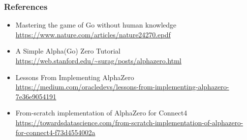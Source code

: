 \begin{frame}[fragile]
  \frametitle{References}

  \begin{itemize}
    \item Mastering the game of Go without human knowledge {\small\url{https://www.nature.com/articles/nature24270.epdf}}
    \item A Simple Alpha(Go) Zero Tutorial {\small\url{https://web.stanford.edu/~surag/posts/alphazero.html}}
    \item Lessons From Implementing AlphaZero {\small\url{https://medium.com/oracledevs/lessons-from-implementing-alphazero-7e36e9054191}}
    \item From-scratch implementation of AlphaZero for Connect4 {\small\url{https://towardsdatascience.com/from-scratch-implementation-of-alphazero-for-connect4-f73d4554002a}}
  \end{itemize}
\end{frame}